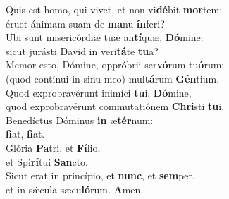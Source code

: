 \oddverse Quis est homo, qui vivet, et non vi\textbf{dé}bit \textbf{mor}tem:~\*\\
\oddverse éruet ánimam suam de \textbf{ma}nu \textbf{ín}feri?\\
\evenverse Ubi sunt misericórdiæ tuæ an\textbf{tí}quæ, \textbf{Dó}mine:~\*\\
\evenverse sicut jurásti David in veri\textbf{tá}te \textbf{tu}a?\\
\oddverse Memor esto, Dómine, oppróbrii ser\textbf{vó}rum tu\textbf{ó}rum:~\*\\
\oddverse (quod contínui in sinu meo) mul\textbf{tá}rum \textbf{Gén}tium.\\
\evenverse Quod exprobravérunt inimíci \textbf{tu}i, \textbf{Dó}mine,~\*\\
\evenverse quod exprobravérunt commutatiónem \textbf{Chri}sti \textbf{tu}i.\\
\oddverse Benedíctus Dóminus \textbf{in} æ\textbf{tér}num:~\*\\
\oddverse \textbf{fi}at, \textbf{fi}at.\\
\evenverse Glória \textbf{Pa}tri, et \textbf{Fí}lio,~\*\\
\evenverse et Spi\textbf{rí}tui \textbf{San}cto.\\
\oddverse Sicut erat in princípio, et \textbf{nunc}, et \textbf{sem}per,~\*\\
\oddverse et in sǽcula sæcu\textbf{ló}rum. \textbf{A}men.\\
